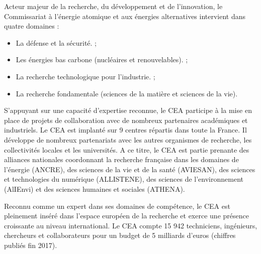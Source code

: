 \documentclass[12pt,a4paper,twoside]{article}
\begin{document}
    Acteur majeur de la recherche, du développement et de l'innovation, le Commissariat à l’énergie atomique et aux énergies alternatives intervient dans quatre domaines :

    \begin{itemize}[label=\textbullet]
        \item    La défense et la sécurité. ;
        \item    Les énergies bas carbone (nucléaires et renouvelables). ;
        \item    La recherche technologique pour l’industrie. ;
        \item    La recherche fondamentale (sciences de la matière et sciences de la vie).
    \end{itemize}

    S’appuyant sur une capacité d’expertise reconnue, le CEA participe à la mise en place de projets de collaboration
    avec de nombreux partenaires académiques et industriels. Le CEA est implanté sur 9 centres répartis dans toute la
    France. Il développe de nombreux partenariats avec les autres organismes de recherche, les collectivités locales
    et les universités. A ce titre, le CEA est partie prenante des alliances nationales coordonnant la recherche
    française dans les domaines de l’énergie (ANCRE), des sciences de la vie et de la santé (AVIESAN), des sciences
    et technologies du numérique (ALLISTENE), des sciences de l’environnement (AlIEnvi) et des sciences humaines et
    sociales (ATHENA).

    Reconnu comme un expert dans ses domaines de compétence, le CEA est pleinement inséré dans l'espace européen de
    la recherche et exerce une présence croissante au niveau international. Le CEA compte 15 942 techniciens,
    ingénieurs, chercheurs et collaborateurs pour un budget de 5 milliards d'euros (chiffres publiés fin 2017).

    \begin{figure}[b]
        \centering
    \end{figure}
\end{document}
